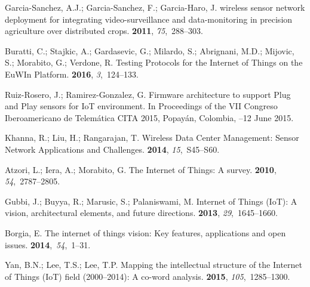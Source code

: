 \documentclass[symmetry,article,accept,moreauthors,pdftex10pt,a4paper]{mdpi}
\begin{document}
\begin{thebibliography}{999}
Garcia-Sanchez, A.J.; Garcia-Sanchez, F.; Garcia-Haro, J.
\newblock wireless sensor network deployment for integrating video-surveillance
and data-monitoring in precision agriculture over distributed crops.
 {\bf 2011}, {\em
	75},~288--303.

Buratti, C.; Stajkic, A.; Gardasevic, G.; Milardo, S.; Abrignani, M.D.;
Mijovic, S.; Morabito, G.; Verdone, R.
\newblock Testing Protocols for the Internet of Things on the EuWIn Platform.
 {\bf 2016}, {\em 3},~124--133.

Ruiz-Rosero, J.; Ramirez-Gonzalez, G.
\newblock Firmware architecture to support Plug and Play sensors for IoT
environment. In Proceedings of the VII Congreso Iberoamericano de Telemática CITA 2015, Popayán, Colombia,
--12 June 2015.

Khanna, R.; Liu, H.; Rangarajan, T.
\newblock Wireless Data Center Management: Sensor Network Applications and
Challenges.
 {\bf 2014}, {\em 15},~S45--S60.

Atzori, L.; Iera, A.; Morabito, G.
\newblock The Internet of Things: A survey.
 {\bf 2010}, {\em 54},~2787--2805.

Gubbi, J.; Buyya, R.; Marusic, S.; Palaniswami, M.
\newblock Internet of Things (IoT): A vision, architectural elements, and
future directions.
 {\bf 2013}, {\em
	29},~1645--1660.

Borgia, E.
\newblock The internet of things vision: Key features, applications and open
issues.
 {\bf 2014},~{\em 54},~1--31.

Yan, B.N.; Lee, T.S.; Lee, T.P.
\newblock Mapping the intellectual structure of the Internet of Things (IoT)
field (2000--2014): A co-word analysis.
 {\bf 2015}, {\em 105},~1285--1300.


\end{thebibliography}
\end{document}
